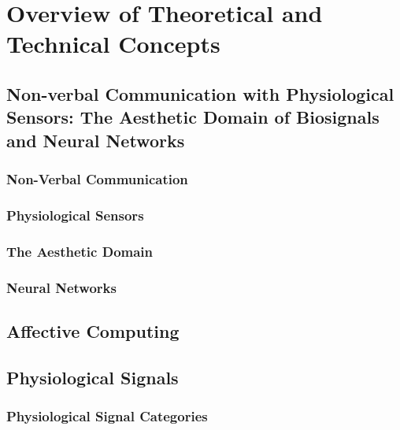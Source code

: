 \chapter{Overview of Theoretical and Technical Concepts}
\label{cha:technical_concepts}

\section{Non-verbal Communication with Physiological Sensors: The Aesthetic Domain of Biosignals and Neural Networks}
\label{subsec:title}


\subsection{Non-Verbal Communication}

\subsection{Physiological Sensors}

\subsection{The Aesthetic Domain}

\subsection{Neural Networks}

\section{Affective Computing}

\section{Physiological Signals}

\subsection{Physiological Signal Categories} 
\label{subsec:catagories}

